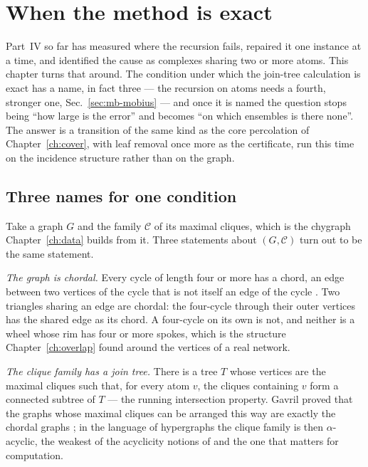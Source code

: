 \chapter{When the method is exact}
\label{ch:exactness}


Part~IV so far has measured where the recursion fails, repaired it one
instance at a time, and identified the cause as complexes sharing two or more
atoms. This chapter turns that around. The condition under which the
join-tree calculation is exact has a name, in fact three --- the recursion
on atoms needs a fourth, stronger one, Sec.~\ref{sec:mb-mobius} --- and
once it is named the
question stops being ``how large is the error'' and becomes ``on which
ensembles is there none''. The answer is a transition of the same kind as the
core percolation of Chapter~\ref{ch:cover}, with leaf removal once more as the
certificate, run this time on the incidence structure rather than on the
graph.

\section{Three names for one condition}
\label{sec:threenames}

Take a graph $G$ and the family $\mathcal{C}$ of its maximal cliques, which is
the chygraph Chapter~\ref{ch:data} builds from it. Three statements about
$(G,\mathcal{C})$ turn out to be the same statement.

\emph{The graph is chordal.} Every cycle of length four or more has a chord,
an edge between two vertices of the cycle that is not itself an edge of the
cycle \citep{dirac1961}. Two triangles sharing an edge are chordal: the
four-cycle through their outer vertices has the shared edge as its chord. A
four-cycle on its own is not, and neither is a wheel whose rim has four or more
spokes, which is the structure Chapter~\ref{ch:overlap} found around the
vertices of a real network.

\emph{The clique family has a join tree.} There is a tree $T$ whose vertices
are the maximal cliques such that, for every atom $v$, the cliques containing
$v$ form a connected subtree of $T$ --- the running intersection property.
Gavril proved that the graphs whose maximal cliques can be arranged this way
are exactly the chordal graphs \citep{gavril1974}; in the language of
hypergraphs the clique family is then $\alpha$-acyclic, the weakest of the
acyclicity notions of \citet{beeri1983} and the one that matters for
computation.

